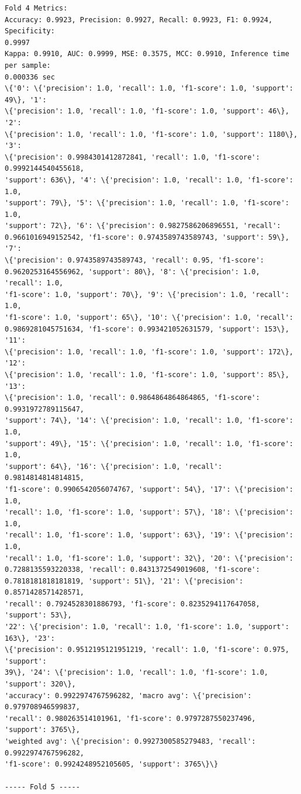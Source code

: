 \documentclass[11pt]{article}
\begin{document}
    \begin{Verbatim}[commandchars=\\\{\}]
Fold 4 Metrics:
Accuracy: 0.9923, Precision: 0.9927, Recall: 0.9923, F1: 0.9924, Specificity:
0.9997
Kappa: 0.9910, AUC: 0.9999, MSE: 0.3575, MCC: 0.9910, Inference time per sample:
0.000336 sec
\{'0': \{'precision': 1.0, 'recall': 1.0, 'f1-score': 1.0, 'support': 49\}, '1':
\{'precision': 1.0, 'recall': 1.0, 'f1-score': 1.0, 'support': 46\}, '2':
\{'precision': 1.0, 'recall': 1.0, 'f1-score': 1.0, 'support': 1180\}, '3':
\{'precision': 0.9984301412872841, 'recall': 1.0, 'f1-score': 0.9992144540455618,
'support': 636\}, '4': \{'precision': 1.0, 'recall': 1.0, 'f1-score': 1.0,
'support': 79\}, '5': \{'precision': 1.0, 'recall': 1.0, 'f1-score': 1.0,
'support': 72\}, '6': \{'precision': 0.9827586206896551, 'recall':
0.9661016949152542, 'f1-score': 0.9743589743589743, 'support': 59\}, '7':
\{'precision': 0.9743589743589743, 'recall': 0.95, 'f1-score':
0.9620253164556962, 'support': 80\}, '8': \{'precision': 1.0, 'recall': 1.0,
'f1-score': 1.0, 'support': 70\}, '9': \{'precision': 1.0, 'recall': 1.0,
'f1-score': 1.0, 'support': 65\}, '10': \{'precision': 1.0, 'recall':
0.9869281045751634, 'f1-score': 0.993421052631579, 'support': 153\}, '11':
\{'precision': 1.0, 'recall': 1.0, 'f1-score': 1.0, 'support': 172\}, '12':
\{'precision': 1.0, 'recall': 1.0, 'f1-score': 1.0, 'support': 85\}, '13':
\{'precision': 1.0, 'recall': 0.9864864864864865, 'f1-score': 0.9931972789115647,
'support': 74\}, '14': \{'precision': 1.0, 'recall': 1.0, 'f1-score': 1.0,
'support': 49\}, '15': \{'precision': 1.0, 'recall': 1.0, 'f1-score': 1.0,
'support': 64\}, '16': \{'precision': 1.0, 'recall': 0.9814814814814815,
'f1-score': 0.9906542056074767, 'support': 54\}, '17': \{'precision': 1.0,
'recall': 1.0, 'f1-score': 1.0, 'support': 57\}, '18': \{'precision': 1.0,
'recall': 1.0, 'f1-score': 1.0, 'support': 63\}, '19': \{'precision': 1.0,
'recall': 1.0, 'f1-score': 1.0, 'support': 32\}, '20': \{'precision':
0.7288135593220338, 'recall': 0.8431372549019608, 'f1-score':
0.7818181818181819, 'support': 51\}, '21': \{'precision': 0.8571428571428571,
'recall': 0.7924528301886793, 'f1-score': 0.8235294117647058, 'support': 53\},
'22': \{'precision': 1.0, 'recall': 1.0, 'f1-score': 1.0, 'support': 163\}, '23':
\{'precision': 0.9512195121951219, 'recall': 1.0, 'f1-score': 0.975, 'support':
39\}, '24': \{'precision': 1.0, 'recall': 1.0, 'f1-score': 1.0, 'support': 320\},
'accuracy': 0.9922974767596282, 'macro avg': \{'precision': 0.979708946599837,
'recall': 0.980263514101961, 'f1-score': 0.9797287550237496, 'support': 3765\},
'weighted avg': \{'precision': 0.9927300585279483, 'recall': 0.9922974767596282,
'f1-score': 0.9924248952105605, 'support': 3765\}\}

----- Fold 5 -----

    \end{Verbatim}
\end{document}
